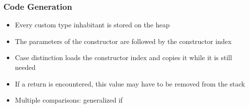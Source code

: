 \documentclass[12pt]{beamer}
\begin{document}
\begin{frame}
    \frametitle{Code Generation}
    \begin{itemize}
        \item Every custom type inhabitant is stored on the heap
        \item The parameters of the constructor are followed by the constructor index
    \end{itemize}
    \begin{itemize}
        \item Case distinction loads the constructor index and copies it while it is still needed
        \item If a return is encountered, this value may have to be removed from the stack
        \item Multiple comparisons: generalized if
    \end{itemize}
\end{frame}
\end{document}
